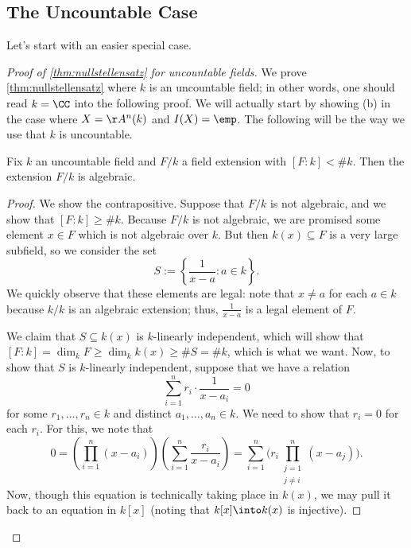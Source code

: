 \documentclass[../notes.tex]{subfiles}
\begin{document}
\subsection{The Uncountable Case}
Let's start with an easier special case.
\begin{proof}[Proof of \autoref{thm:nullstellensatz} for uncountable fields]
	We prove \autoref{thm:nullstellensatz} where $k$ is an uncountable field; in other words, one should read $k=\CC$ into the following proof. We will actually start by showing (b) in the case where $X=\AA^n(k)$ and $I(X)=\emp$. The following will be the way we use that $k$ is uncountable.
	\begin{lemma} \label{lem:useuncountable}
		Fix $k$ an uncountable field and $F/k$ a field extension with $[F:k]<\#k$. Then the extension $F/k$ is algebraic.
	\end{lemma}
	\begin{proof}
		We show the contrapositive. Suppose that $F/k$ is not algebraic, and we show that $[F:k]\ge\#k$. Because $F/k$ is not algebraic, we are promised some element $x\in F$ which is not algebraic over $k$. But then $k(x)\subseteq F$ is a very large subfield, so we consider the set
		\[S:=\left\{\frac1{x-a}:a\in k\right\}.\]
		We quickly observe that these elements are legal: note that $x\ne a$ for each $a\in k$ because $k/k$ is an algebraic extension; thus, $\frac1{x-a}$ is a legal element of $F$.
		
		We claim that $S\subseteq k(x)$ is $k$-linearly independent, which will show that $[F:k]=\dim_kF\ge\dim_kk(x)\ge\#S=\#k$, which is what we want. Now, to show that $S$ is $k$-linearly independent, suppose that we have a relation
		\[\sum_{i=1}^nr_i\cdot\frac1{x-a_i}=0\]
		for some $r_1,\ldots,r_n\in k$ and distinct $a_1,\ldots,a_n\in k$. We need to show that $r_i=0$ for each $r_i$. For this, we note that
		\[0=\left(\prod_{i=1}^n(x-a_i)\right)\left(\sum_{i=1}^n\frac{r_i}{x-a_i}\right)=\sum_{i=1}^n\Bigg(r_i\prod_{\substack{j=1\\j\ne i}}^n(x-a_j)\Bigg).\tag{$*$}\label{eq:readytoplug}\]
		Now, though this equation is technically taking place in $k(x)$, we may pull it back to an equation in $k[x]$ (noting that $k[x]\into k(x)$ is injective).


\end{proof}
\end{proof}
\end{document}
